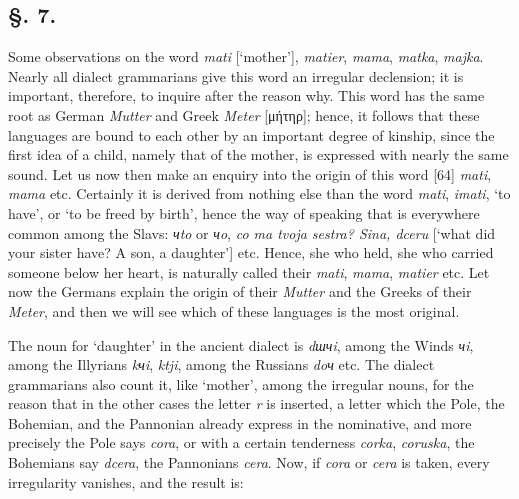 \subsection*{\hspace*{\fill}§. 7.\hspace*{\fill}}

Some observations on the word \textit{mati} [‘mother’], \textit{matier}, \textit{mama}, \textit{matka}, \textit{majka}. Nearly all dialect grammarians give this word an irregular declension; it is important, therefore, to inquire after the reason why. This word has the same root as German \textit{Mutter} and Greek \textit{Meter} [μήτηρ]; hence, it follows that these languages are bound to each other by an important degree of kinship, since the first idea of a child, namely that of the mother, is expressed with nearly the same sound. Let us now then make an enquiry into the origin of this word [64] \textit{mati}, \textit{mama} etc. Certainly it is derived from nothing else than the word \textit{mati}, \textit{imati}, ‘to have’, or ‘to be freed by birth’, hence the way of speaking that is everywhere common among the Slavs: \textit{чto} or \textit{чo}, \textit{co ma tvoja sestra? Sina, dceru} [‘what did your sister have? A son, a daughter’] etc. Hence, she who held, she who carried someone below her heart, is naturally called their \textit{mati}, \textit{mama}, \textit{matier} etc. Let now the Germans explain the origin of their \textit{Mutter} and the Greeks of their \textit{Meter}, and then we will see which of these languages is the most original.

The noun for ‘daughter’ in the ancient dialect is \textit{dшчi}, among the Winds \textit{чi}, among the Illyrians \textit{kчi}, \textit{ktji}, among the Russians \textit{doч} etc. The dialect grammarians also count it, like ‘mother’, among the irregular nouns, for the reason that in the other cases the letter \textit{r} is inserted, a letter which the Pole, the Bohemian, and the Pannonian already express in the nominative, and more precisely the Pole says \textit{cora}, or with a certain tenderness \textit{corka}, \textit{coruska}, the Bohemians say \textit{dcera}, the Pannonians \textit{cera}. Now, if \textit{cora} or \textit{cera} is taken, every irregularity vanishes, and the result is:

